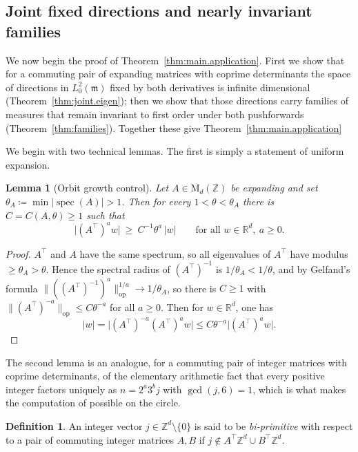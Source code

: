 \documentclass[11pt,reqno]{amsart}
\theoremstyle{plain}
\newtheorem{lem}[thm]{Lemma}
\theoremstyle{definition}
\newtheorem{dft}[thm]{Definition}
\newcommand{\Z}{\mathbb{Z}}
\newcommand{\R}{\mathbb{R}}
\newcommand{\Leb}{\mathfrak{m}}
\DeclareMathOperator{\spec}{spec}
\begin{document}
\subsection{Joint fixed directions and nearly invariant families}
We now begin the proof of Theorem~\ref{thm:main.application}. 
First we show that for a commuting pair of expanding matrices with coprime determinants the space of directions in \(L^2_0(\Leb)\) fixed by both derivatives is infinite dimensional (Theorem~\ref{thm:joint.eigen}); then we show that those directions carry families of measures that remain invariant to first order under both pushforwards (Theorem~\ref{thm:families}). 
Together these give Theorem~\ref{thm:main.application}

We begin with two technical lemmas.
The first is simply a statement of uniform expansion.

\begin{lem}[Orbit growth control]
    \label{lem:orbit.growth}
    Let \( A\in \mathrm{M}_d(\Z) \) be expanding and set \( \theta_A\coloneqq \min\lvert \spec(A) \rvert>1 \).
    Then for every \( 1<\theta<\theta_A \) there is \( C=C(A,\theta)\ge1 \) such that
    \[
        \big\lvert (A^{\top})^{a}w\big \rvert\ \ge\ C^{-1}\theta^{a}\,\lvert w \rvert \qquad\text{for all } w\in\R^d,\ a\ge0 .
    \]
\end{lem}

\begin{proof}
    \( A^{\top} \) and \( A \) have the same spectrum, so all eigenvalues of \( A^{\top} \) have modulus \( \ge\theta_A>\theta \).
    Hence the spectral radius of \( (A^{\top})^{-1} \) is \( 1/\theta_A<1/\theta \), and by Gelfand's formula \( \lVert ((A^{\top})^{-1})^{a} \rVert_{\mathrm{op}}^{1/a}\to1/\theta_A \), so there is \( C\ge1 \) with \( \lVert (A^{\top})^{-a} \rVert_{\mathrm{op}}\le C\theta^{-a} \) for all \( a\ge0 \).
    Then for \( w\in\R^d \), one has
    \[
        \lvert w \rvert=\lvert (A^{\top})^{-a}(A^{\top})^{a}w \rvert\le C\theta^{-a}\lvert (A^{\top})^{a}w \rvert.
    \] 
\end{proof}

The second lemma is an analogue, for a commuting pair of integer matrices with coprime determinants, of the elementary arithmetic fact that every positive integer factors uniquely as \( n=2^{a}3^{b}j \) with \( \gcd(j,6)=1 \), which is what makes the computation of \cite[\S7]{kloeckner_optimal_2013_preprint} possible on the circle.

\begin{dft}
    An integer vector \( j\in\Z^d\setminus\{0\} \) is said to be \emph{bi-primitive} with respect to a pair of commuting integer matrices \(A, B\) if \( j\notin A^{\top}\Z^d\cup B^{\top}\Z^d \).
\end{dft}
\end{document}

